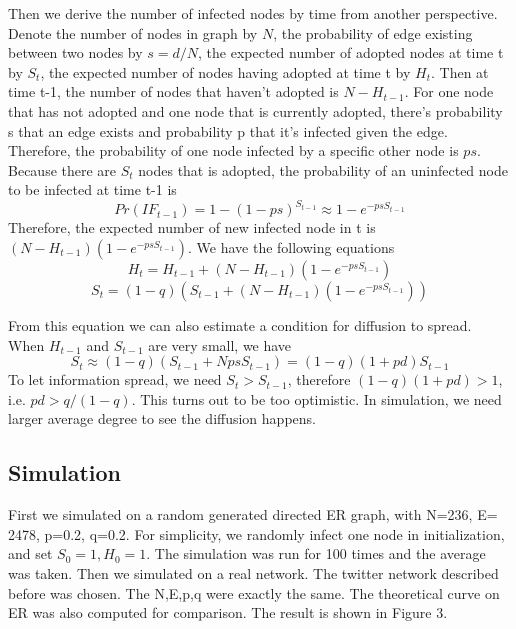 \documentclass{article}
\begin{document}
Then we derive the number of infected nodes by time from another perspective. Denote the number of nodes in graph by $N$, the probability of edge existing between two nodes by $s=d/N$, the expected number of adopted nodes at time t by $S_t$, the expected number of nodes having adopted at time t by $H_t$. Then at time t-1, the number of nodes that haven’t adopted is $N-H_{t-1}$. For one node that has not adopted and one node that is currently adopted, there’s probability s that an edge exists and probability p that it’s infected given the edge. Therefore, the probability of one node infected by a specific other node is $ps$. Because there are $S_t$ nodes that is adopted, the probability of an uninfected node to be infected at time t-1 is
\begin{equation}
Pr(IF_{t-1})=1-(1-ps)^{S_{t-1}}\approx 1-e^{-psS_{t-1}}
\end{equation}
Therefore, the expected number of new infected node in t is $(N-H_{t-1})(1-e^{-ps{S}_{t-1}})$. We have the following equations
\begin{equation}
H_t=H_{t-1}+(N-H_{t-1})(1-e^{-ps{S}_{t-1}})
\end{equation}
\begin{equation}
S_t=(1-q)(S_{t-1}+(N-H_{t-1})(1-e^{-psS_{t-1}}))
\end{equation}

From this equation we can also estimate a condition for diffusion to spread. When $H_{t-1}$ and $S_{t-1}$ are very small, we have 
\begin{equation}
S_t\approx(1-q)(S_{t-1}+NpsS_{t-1})=(1-q)(1+pd)S_{t-1}
\end{equation} 
To let information spread, we need $S_t>S_{t-1}$, therefore $(1-q)(1+pd)>1$, i.e. $pd>q/(1-q)$. This turns out to be too optimistic. In simulation, we need larger average degree to see the diffusion happens.

\subsection{Simulation}
First we simulated on a random generated directed ER graph, with N=236, E= 2478, p=0.2, q=0.2. For simplicity, we randomly infect one node in initialization, and set $S_0=1,H_0=1$. The simulation was run for 100 times and the average was taken. Then we simulated on a real network. The twitter network described before was chosen. The N,E,p,q were exactly the same. The theoretical curve on ER was also computed for comparison. The result is shown in Figure 3.
\end{document}
